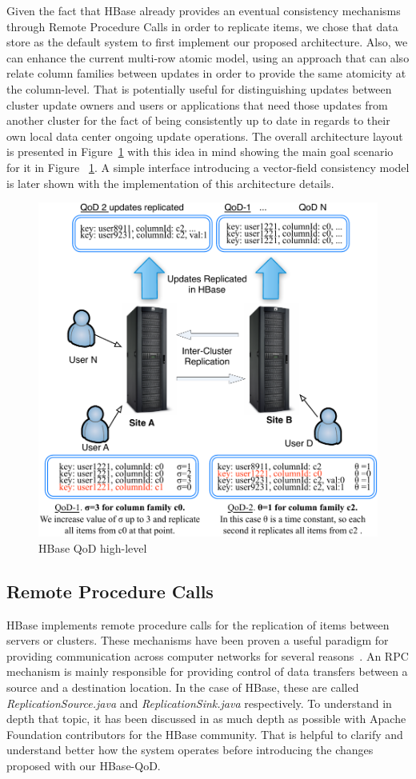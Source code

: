 Given the fact that HBase already provides an eventual consistency mechanisms through Remote Procedure Calls in order to replicate items, we chose that data store as the default system to first implement our proposed architecture. Also, we can enhance the current multi-row atomic model, using an approach that can also relate column families between updates in order to provide the same atomicity at the column-level. That is potentially useful for distinguishing updates between cluster update owners and users or applications that need those updates from another cluster for the fact of being consistently up to date in regards to their own local data center ongoing update operations. The overall architecture layout is presented in Figure~\ref{fig-high-level} with this idea in mind showing the main goal scenario for it in Figure ~\ref{fig-high-level}. A simple interface introducing a vector-field consistency model is later shown with the implementation of this architecture details.

\begin{figure}[t]
\centering
\includegraphics[width=0.8\linewidth]{figs/highlevel.pdf}
\caption{HBase QoD high-level}
\label{fig-high-level}
\end{figure}

\subsection{Remote Procedure Calls}
HBase implements remote procedure calls for the replication of items between servers or clusters. These mechanisms have been proven a useful paradigm for providing communication across computer networks for several reasons~\cite{Birrell:1984}. An RPC mechanism is mainly responsible for providing control of data transfers between a source and a destination location. In the case of HBase, these are called \emph{ReplicationSource.java} and \emph{ReplicationSink.java} respectively. To understand in depth that topic, it has been discussed in as much depth as possible with Apache Foundation contributors for the HBase community. That is helpful to clarify and understand better how the system operates before introducing the changes proposed with our HBase-QoD.

